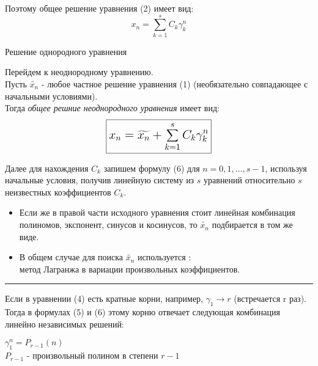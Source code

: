 \documentclass[a4paper,11pt]{article}
\begin{document}
    Поэтому общее решение уравнения (2) имеет вид:
    \begin{equation}
      x_n = \sum_{k=1}^{s}C_k\gamma_k^n
    \end{equation}
    \begin{center}
      Решение однородного уравнения \\
    \end{center}

    Перейдем к неоднородному уравнению. \\

    Пусть $\widetilde{x_n}$ - любое частное решение уравнения (1) (необязательно совпадающее с начальными условиями). \\
    Тогда \textit{общее решние неоднородного уравнения} имеет вид:
    \begin{equation}
      \Large
      {
        \boxed{x_n = \widetilde{x_n} + \sum_{k=1}^{s}C_k\gamma_k^n} \\
      }
    \end{equation}

    Далее для нахождения ${C_k}$ запишем формулу (6) для $n=0,1,...,s-1$, используя начальные условия, получив линейную систему из $s$ уравнений относительно $s$ неизвестных коэффициентов $C_k$. \\
    \begin{itemize}
      \item Если же в правой части исходного уравнения стоит линейная комбинация полиномов, экспонент, синусов и косинусов, то $\widetilde{x_n}$ подбирается в том же виде.
      \item В общем случае для поиска $\widetilde{x_n}$ используется :\\
        $\textbf{метод Лагранжа в вариации произвольных коэффициентов}$.
    \end{itemize}

    \vspace*{20mm}
    \hrule
     Если в уравнении (4) есть кратные корни, например, $\gamma_1 \rightarrow r$ (встречается r раз).
    Тогда в формулах (5) и (6) этому корню отвечает следующая комбинация линейно независимых решений:
    \begin{center}
      $\gamma_1^n = P_{r-1}(n)$ \\
      \footnotesize{$P_{r-1}$ - произвольный полином в степени $r-1$}
    \end{center}
\end{document}
